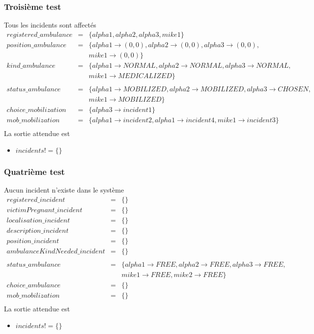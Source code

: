 \documentclass{report}
\begin{document}
\subsubsection{Troisième test}
Tous les incidents sont affectés
\begin{eqnarray*}
registered\_ambulance &=& \{alpha1, alpha2, alpha3, mike1\}\\
position\_ambulance &=& \{alpha1 \rightarrow (0,0), alpha2 \rightarrow (0,0), alpha3 \rightarrow (0,0), \\ 
	&& mike1 \rightarrow (0,0)\}\\
kind\_ambulance &=& \{alpha1 \rightarrow NORMAL, alpha2 \rightarrow NORMAL, alpha3 \rightarrow NORMAL, \\ 
	&& mike1 \rightarrow MEDICALIZED\} \\
\\
status\_ambulance &=& \{alpha1 \rightarrow MOBILIZED, alpha2 \rightarrow MOBILIZED, alpha3 \rightarrow CHOSEN, \\ 
	&& mike1 \rightarrow MOBILIZED\} \\
choice\_mobilization &=& \{alpha3 \rightarrow incident1\} \\
mob\_mobilization &=& \{alpha1 \rightarrow incident2, alpha1 \rightarrow incident4, mike1 \rightarrow incident3\} \\
\end{eqnarray*}
La sortie attendue est 
\begin{itemize}
	\item $incidents! = \{\}$
\end{itemize}

\subsubsection{Quatrième test}
Aucun incident n'existe dans le système
\begin{eqnarray*}
registered\_incident &=& \{\}\\
victimPregnant\_incident &=& \{\}\\
localisation\_incident &=& \{\}\\
description\_incident &=& \{\}\\
position\_incident &=& \{\}\\
ambulanceKindNeeded\_incident &=& \{\}\\
\\
status\_ambulance &=& \{alpha1 \rightarrow FREE, alpha2 \rightarrow FREE, alpha3 \rightarrow FREE, \\ 
	&& mike1 \rightarrow FREE, mike2 \rightarrow FREE\} \\
choice\_ambulance &=& \{\} \\
mob\_mobilization &=& \{\} \\
\end{eqnarray*}
La sortie attendue est 
\begin{itemize}
	\item $incidents! = \{\}$
\end{itemize}
\end{document}
